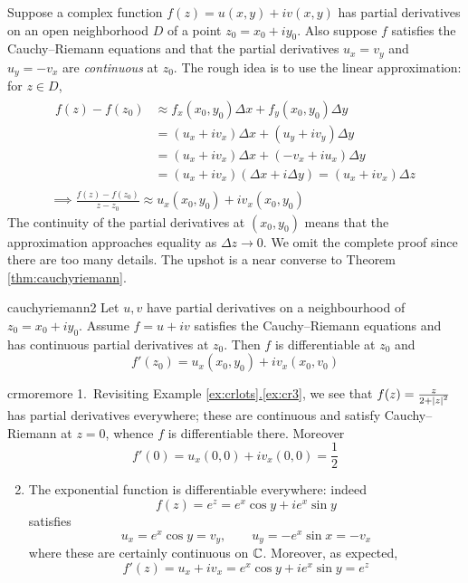 Suppose a complex function $f(z)=u(x,y)+iv(x,y)$ has partial derivatives on an open neighborhood $D$ of a point $z_0=x_0+iy_0$. Also suppose $f$ satisfies the Cauchy--Riemann equations and that the partial derivatives $u_x=v_y$ and $u_y=-v_x$ are \emph{continuous} at $z_0$. The rough idea is to use the linear approximation: for $z\in D$,
\begin{gather*}
\begin{aligned}
f(z)-f(z_0)&\approx f_x(x_0,y_0)\Delta x+f_y(x_0,y_0)\Delta y\\
&=(u_x+iv_x)\Delta x+(u_y+iv_y)\Delta y\\
&=(u_x+iv_x)\Delta x+(-v_x+iu_x)\Delta y\\
&=(u_x+iv_x)(\Delta x+i\Delta y) =(u_x+iv_x)\Delta z
\end{aligned}\\
\implies \frac{f(z)-f(z_0)}{z-z_0}\approx u_x(x_0,y_0)+iv_x(x_0,y_0) 
\end{gather*}
The continuity of the partial derivatives at $(x_0,y_0)$ means that the approximation approaches equality as $\Delta z\to 0$. We omit the complete proof since there are too many details. The upshot is a near converse to Theorem \ref{thm:cauchyriemann}.

\begin{thm}{}{cauchyriemann2}
Let $u,v$ have partial derivatives on a neighbourhood of $z_0=x_0+iy_0$. Assume $f=u+iv$ satisfies the Cauchy--Riemann equations and has continuous partial derivatives at $z_0$. Then $f$ is differentiable at $z_0$ and
\[f'(z_0)=u_x(x_0,y_0)+iv_x(x_0,v_0)\]
\end{thm}

\begin{examples}{}{crmoremore}
\hangindent\leftmargini
\textup{1.}\ Revisiting Example \hyperref[ex:cr3]{\ref*{ex:crlots}.\ref*{ex:cr3}}, we see that $f(z)=\frac z{2+\left| z\right|^2}$ has partial derivatives everywhere; these are continuous and satisfy Cauchy--Riemann at $z=0$, whence $f$ is differentiable there. Moreover 
  \[f'(0)=u_x(0,0)+iv_x(0,0)=\frac 12\]
\begin{enumerate}\setcounter{enumi}{1}
  \item\label{ex:crexex2} The exponential function is differentiable everywhere: indeed
  \[f(z)=e^z=e^x\cos y+ie^x\sin y\]
  satisfies
  \[u_x=e^x\cos y=v_y,\qquad u_y=-e^x\sin x=-v_x\]
  where these are certainly continuous on $\mathbb{C}$. Moreover, as expected,
  \[f'(z)=u_x+iv_x=e^x\cos y+ie^x\sin y =e^z\]
\end{enumerate}
\end{examples}




